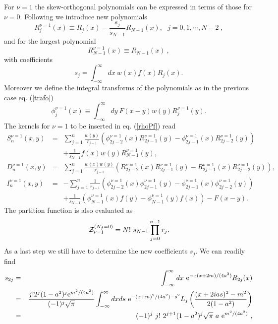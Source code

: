 \documentclass[11pt]{article}
\begin{document}
For $\nu=1$ the skew-orthogonal polynomials can be expressed in terms
of those for $\nu=0$. Following \cite{NF98} we introduce new polynomials
\begin{equation}
R^{\nu=1}_j(x) \equiv R_j(x) - \frac{s_j}{s_{N-1}} R_{N-1}(x), \ \ \  
j = 0,1,\cdots,N-2\ ,
\label{Rrel}
\end{equation}
and for the largest polynomial
\begin{equation}
R^{\nu=1}_{N-1}(x) \equiv R_{N-1}(x)\ ,
\end{equation}
with coefficients
\begin{equation}
s_j = \int_{-\infty}^{\infty} dx \ w(x) f(x) R_j(x).
\end{equation}
Moreover we define the integral transforms of the polynomials as in the
previous case eq. (\ref{trafo})
\begin{equation}
\phi^{\nu=1}_j(x) \equiv \int_{-\infty}^{\infty} dy \ F(x-y) w(y) 
R^{\nu=1}_j(y).
\end{equation}
The kernels for $\nu=1$ to be inserted in eq. (\ref{rhoPf}) read \cite{NF98}
\begin{eqnarray}
S^{\nu=1}_n(x,y) & = & \sum_{j=1}^n \frac{w(y)}{r_{j-1}} \left( 
\phi^{\nu=1}_{2 j - 2}(x) R^{\nu=1}_{2 j - 1}(y) - 
\phi^{\nu=1}_{2 j - 1}(x) R^{\nu=1}_{2 j - 2}(y) \right)
\nonumber \\ & & 
+ \frac{1}{s_{N-1}} f(x) w(y) R^{\nu=1}_{N-1}(y), \nonumber \\ 
D^{\nu=1}_n(x,y) & = & \sum_{j=1}^n \frac{w(x) w(y)}{r_{j-1}} \left( 
R^{\nu=1}_{2 j - 2}(x) R^{\nu=1}_{2 j - 1}(y) - 
R^{\nu=1}_{2 j - 1}(x) R^{\nu=1}_{2 j - 2}(y) \right),
\nonumber \\ 
I^{\nu=1}_n(x,y) & = & - \sum_{j=1}^n \frac{1}{r_{j-1}} \left( 
\phi^{\nu=1}_{2 j - 2}(x) \phi^{\nu=1}_{2 j - 1}(y) - 
\phi^{\nu=1}_{2 j - 1}(x) \phi^{\nu=1}_{2 j - 2}(y) \right) 
\nonumber \\ & & + \frac{1}{s_{N-1}} \left( \phi^{\nu=1}_{N-1}(x) f(y) - 
\phi^{\nu=1}_{N-1}(y) f(x) \right) - F(x - y).
\label{nu=1Ker}
\end{eqnarray}
The partition function is also evaluated as
\begin{equation}
{\cal Z}^{(N_f = 0)}_{\nu = 1} = N!\ s_{N-1} \prod_{j=0}^{n-1} r_j.
\end{equation}
As a last step we still have to determine the new coefficients $s_j$.
We can readily find
\begin{eqnarray}
s_{2 j} & = & \int_{-\infty}^{\infty} dx \ {\rm e}^{-x(x + 2 m)/(4 a^2)} 
R_{2 j}(x) \nonumber \\ 
& = & \frac{j! 2^j (1 - a^2)^j {\rm e}^{m^2/(4 a^2)}}{(-1)^j \sqrt{\pi}} 
\int_{-\infty}^{\infty} dx ds \ {\rm e}^{-(x + m)^2/(4 a^2) - s^2} L_j\left( 
\frac{(x + 2 i a s)^2 - m^2}{2 (1 - a^2)} \right) 
\nonumber \\ 
& = & (-1)^j \ j! \ 2^{j+1} (1 - a^2)^j \sqrt{\pi} 
\ a \ {\rm e}^{m^2/(4 a^2)}\ ,
\end{eqnarray}
\end{document}
